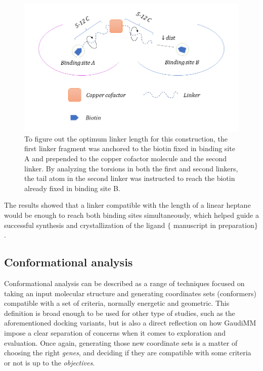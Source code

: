 \begin{figure}[H] %
	\begin{Center}
		\includegraphics[width=\textwidth]{./figures/06/dibiotin-scheme.png}
	\end{Center}
	\caption[Linker length optimization]{To figure out the optimum linker length for this construction, the first linker fragment was anchored to the biotin fixed in binding site A and prepended to the copper cofactor molecule and the second linker. By analyzing the torsions in both the first and second linkers, the tail atom in the second linker was instructed to reach the biotin already fixed in binding site B.}
	\label{fig:dibiotin-linker-length}
\end{figure}

The results showed that a linker compatible with the length of a linear heptane would be enough to reach both binding sites simultaneously, which helped guide a successful synthesis and crystallization of the ligand $ \{ $ manuscript in preparation$ \} $ .

\subsection{Conformational analysis}
Conformational analysis can be described as a range of techniques focused on taking an input molecular structure and generating coordinates sets (conformers) compatible with a set of criteria, normally energetic and geometric. This definition is broad enough to be used for other type of studies, such as the aforementioned docking variants, but is also a direct reflection on how GaudiMM impose a clear separation of concerns when it comes to exploration and evaluation. Once again, generating those new coordinate sets is a matter of choosing the right \textit{genes}, and deciding if they are compatible with some criteria or not is up to the \textit{objectives}.

